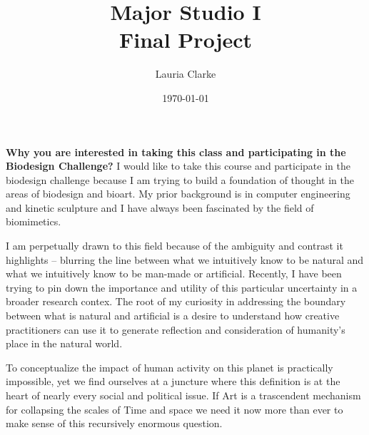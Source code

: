 \documentclass[11pt]{report}
\title{Major Studio I \\ Final Project}
\date{\today}
\author{Lauria Clarke}
\begin{document}
\maketitle
                                                                                                                                                                                                                                                                                                                                                                                                                                                                                                                                                                                                                                                                                                                              \tx
\textbf{Why you are interested in taking this class and participating in the Biodesign Challenge?}                                                                                                                                                                                                                                                                                                                                                                                                                                                   
I would like to take this course and participate in the biodesign challenge because I am trying to build a foundation of thought in the areas of biodesign and bioart. My prior background is in computer engineering and kinetic sculpture and I have always been fascinated by the field of biomimetics. 

I am perpetually drawn to this field because of the ambiguity and contrast it highlights -- blurring the line between what we intuitively know to be natural and what we intuitively know to be man-made or artificial. Recently, I have been trying to pin down the importance and utility of this particular uncertainty in a broader research contex. The root of my curiosity in addressing the boundary between what is natural and artificial is a desire to understand how creative practitioners can use it to generate reflection and consideration of humanity's place in the natural world. 

To conceptualize the impact of human activity on this planet is practically impossible, yet we find ourselves at a juncture where this definition is at the heart of nearly every social and political issue. If Art is a trascendent mechanism for collapsing the scales of Time and space we need it now more than ever to make sense of this recursively enormous question.  
\end{document}
